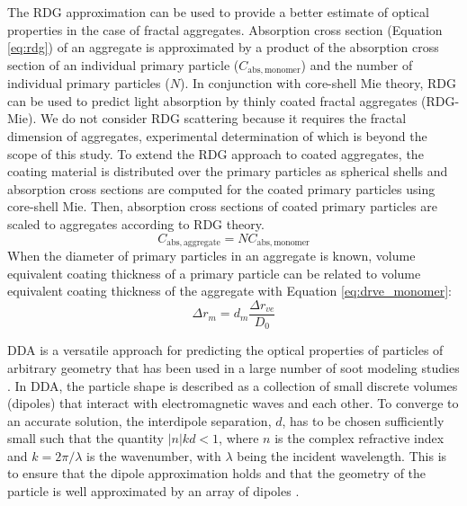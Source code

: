 The RDG approximation \citep{RN40,kerker2016scattering} can be used to provide a better estimate of optical properties in the case of fractal aggregates. Absorption cross section (Equation \ref{eq:rdg}) of an aggregate is approximated by a product of the absorption cross section of an individual primary particle ($C_\mathrm{abs,monomer}$) and the number of individual primary particles ($N$). In conjunction with core-shell Mie theory, RDG can be used to predict light absorption by thinly coated fractal aggregates (RDG-Mie). We do not consider RDG scattering because it requires the fractal dimension of aggregates, experimental determination of which is beyond the scope of this study. To extend the RDG approach to coated aggregates, the coating material is distributed over the primary particles as spherical shells and absorption cross sections are computed for the coated primary particles using core-shell Mie. Then, absorption cross sections of coated primary particles are scaled to aggregates according to RDG theory.
\begin{equation}
    C_\mathrm{abs,aggregate}=NC_\mathrm{abs,monomer}
    \label{eq:rdg}
\end{equation}
When the diameter of primary particles in an aggregate is known, volume equivalent coating thickness of a primary particle can be related to volume equivalent coating thickness of the aggregate with Equation \ref{eq:drve_monomer}:
\begin{equation}
    \Delta r_{m}=d_m\frac{\Delta r_{ve}}{D_0}
    \label{eq:drve_monomer}
\end{equation}

DDA \citep{RN33} is a versatile approach for predicting the optical properties of particles of arbitrary geometry that has been used in a large number of soot modeling studies \citep{RN26,RN27,RN28}. In DDA, the particle shape is described as a collection of small discrete volumes (dipoles) that interact with electromagnetic waves and each other. To converge to an accurate solution, the interdipole separation, $d$, has to be chosen sufficiently small such that the quantity $|n|kd < 1$, where $n$ is the complex refractive index and $k = 2\pi/\lambda$ is the wavenumber, with $\lambda$ being the incident wavelength. This is to ensure that the dipole approximation holds \citep{RN29} and that the geometry of the particle is well approximated by an array of dipoles \citep{RN30}.

